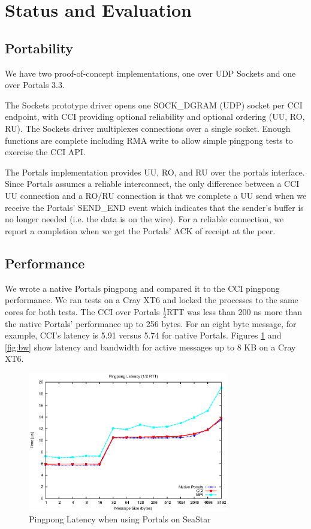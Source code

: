\section{Status and Evaluation}
\label{sec:evaluation}

\subsection{Portability}
We have two proof-of-concept implementations, one over UDP Sockets and
one over Portals 3.3.

The Sockets prototype driver opens one SOCK\_DGRAM (UDP) socket per
CCI endpoint, with CCI  providing optional reliability and optional
ordering (UU, RO, RU). 
The Sockets driver multiplexes connections over a single socket.
Enough functions are complete including RMA write to allow simple pingpong
tests to exercise the CCI API.

The Portals implementation provides UU, RO, and RU over the portals
interface. Since Portals assumes a reliable interconnect, the
only difference between a CCI UU connection and a RO/RU connection is that we
complete a UU send when we receive the Portals' SEND\_END event which indicates
that the sender's buffer is no longer needed (i.e. the data is on the wire).
For a reliable connection, we report a completion when we get the Portals' ACK
of receipt at the peer.

\subsection{Performance}
We wrote a native Portals pingpong and compared it to the CCI pingpong
performance. We ran tests on a Cray XT6 and locked the processes to the same
cores for both tests. The CCI over Portals \begin{math}\frac{1}{2}\end{math}RTT
was less than 200 ns more than the native Portals' performance up to 256 bytes.
For an eight byte message, for example, CCI's latency is 5.91 \us versus 5.74
\us for native Portals. Figures \ref{fig:latency} and \ref{fig:bw} show latency
and bandwidth for active messages up to 8 KB on a Cray XT6.

\begin{figure}[htbp]
\centering
\includegraphics[width=3.45in]{pingpong-latency.eps}
\caption{Pingpong Latency when using Portals on SeaStar}
\label{fig:latency}
\end{figure}

